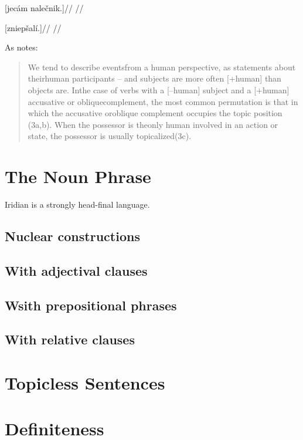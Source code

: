 \a
\begingl
\gla \relax[Tereza] [jec\'am nale\v{c}nik.]//
\glft {}//
\endgl

\a
\begingl
\gla \relax[Shl\'ed] [zniep\v{s}al\'i.]//
\glft {}//
\endgl

\xe

As \textcite[9]{kiss2004} notes:

\begin{quote}
  We tend to describe eventsfrom a human perspective, as statements about theirhuman participants – and subjects are more often [+human] than objects are. Inthe case of verbs with a [–human] subject and a [+human] accusative or obliquecomplement,  the  most  common  permutation  is  that  in  which  the  accusative  oroblique complement occupies the topic position (3a,b). When the possessor is theonly human involved in an action or state, the possessor is usually topicalized(3c).
\end{quote}

\section{The Noun Phrase}

Iridian is a strongly head-final language.

\subsection{Nuclear constructions}
\subsection{With adjectival clauses}
\subsection{Wsith prepositional phrases}
\subsection{With relative clauses}

\section{Topicless Sentences}\label{sec:topicless}

\section{Definiteness}\label{sec:definiteness}




